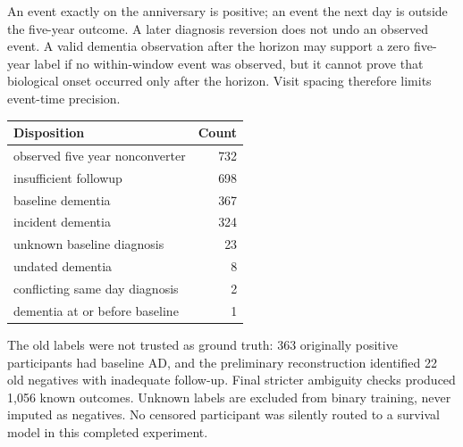 \documentclass[11pt,a4paper]{article}
\begin{document}
An event exactly on the anniversary is positive; an event the next day is outside the five-year outcome. A later diagnosis reversion does not undo an observed event. A valid dementia observation after the horizon may support a zero five-year label if no within-window event was observed, but it cannot prove that biological onset occurred only after the horizon. Visit spacing therefore limits event-time precision.
\begin{center}\small
\begin{tabular}{p{.70\linewidth}r}\hline
Disposition & Count\\\hline
observed five year nonconverter & 732\\
insufficient followup & 698\\
baseline dementia & 367\\
incident dementia & 324\\
unknown baseline diagnosis & 23\\
undated dementia & 8\\
conflicting same day diagnosis & 2\\
dementia at or before baseline & 1\\
\hline\end{tabular}\end{center}
The old labels were not trusted as ground truth: 363 originally positive participants had baseline AD, and the preliminary reconstruction identified 22 old negatives with inadequate follow-up. Final stricter ambiguity checks produced 1,056 known outcomes. Unknown labels are excluded from binary training, never imputed as negatives. No censored participant was silently routed to a survival model in this completed experiment.

\clearpage
\end{document}
